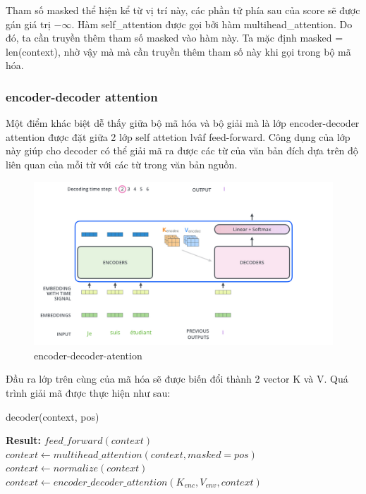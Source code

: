 Tham số masked thể hiện kể từ vị trí này, các phần tử phía sau của score sẽ được gán giá trị $-\infty$. Hàm self\_attention được gọi bởi hàm multihead\_attention. Do đó, ta cần truyền thêm tham số masked vào hàm này. Ta mặc định masked = len(context), nhờ vậy mà mà cần truyền thêm tham số này khi gọi trong bộ mã hóa.


\subsubsection{encoder-decoder attention}
Một điểm khác biệt dễ thấy giữa bộ mã hóa và bộ giải mà là lớp encoder-decoder attention được đặt giữa 2 lớp self attetion lvâf feed-forward. Công dụng của lớp này giúp cho decoder có thể giải mã ra được các từ của văn bản đích dựa trên độ liên quan của mỗi từ với các từ trong văn bản nguồn. 

\begin{figure}[H]
    \begin{center}
        \includegraphics[scale=0.45]{images/encoder-decoder-attention}
        \caption{encoder-decoder-atention}
        \label{fig:encoder-decoder-attention}
    \end{center}
\end{figure}

Đầu ra lớp trên cùng của mã hóa sẽ được biến đổi thành 2 vector K và V. Quá trình giải mã được thực hiện như sau:


\begin{algorithm}[H]
    \caption{decoder(context, pos)}
    \begin{algorithmic}[1]
		\State \textbf{Result:} $feed\_forward(context)$
		\State $context \gets multihead\_attention(context, masked = pos)$
		\State $context \gets normalize(context)$
		\State $context \gets encoder\_decoder\_attention(K_{enc}, V_{env}, context)$
    \end{algorithmic}
\end{algorithm}

